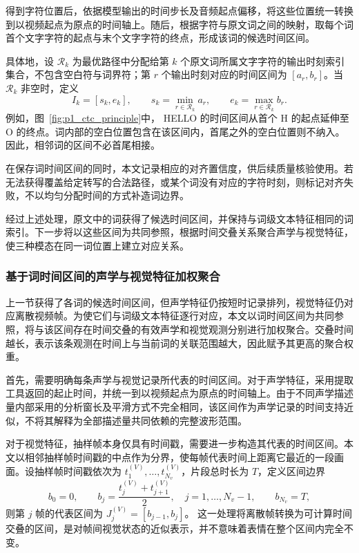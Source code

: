 得到字符位置后，依据模型输出的时间步长及音频起点偏移，将这些位置统一转换到以视频起点为原点的时间轴上。随后，根据字符与原文词之间的映射，取每个词首个文字字符的起点与末个文字字符的终点，形成该词的候选时间区间。

具体地，设 $\mathcal{R}_k$ 为最优路径中分配给第 $k$ 个原文词所属文字字符的输出时刻索引集合，不包含空白符与词界符；第 $r$ 个输出时刻对应的时间区间为 $[a_r,b_r]$。当 $\mathcal{R}_k$ 非空时，定义
\begin{equation}
I_k=[s_k,e_k],
\qquad
s_k=\min_{r\in\mathcal{R}_k}a_r,
\qquad
e_k=\max_{r\in\mathcal{R}_k}b_r.
\label{eq:p1_ctc_word_interval}
\end{equation}
例如，图~\ref{fig:p1_ctc_principle}中，
HELLO 的时间区间从首个 H 的起点延伸至
O 的终点。词内部的空白位置包含在该区间内，首尾之外的空白位置则不纳入。因此，相邻词的区间不必首尾相接。

在保存词时间区间的同时，本文记录相应的对齐置信度，供后续质量核验使用。若无法获得覆盖给定转写的合法路径，或某个词没有对应的字符时刻，则标记对齐失败，不以均匀分配时间的方式补造词边界。

经过上述处理，原文中的词获得了候选时间区间，并保持与词级文本特征相同的词索引。下一步将以这些区间为共同参照，根据时间交叠关系聚合声学与视觉特征，使三种模态在同一词位置上建立对应关系。



\subsubsection{基于词时间区间的声学与视觉特征加权聚合}

上一节获得了各词的候选时间区间，但声学特征仍按短时记录排列，视觉特征仍对应离散视频帧。为使它们与词级文本特征逐行对应，本文以词时间区间为共同参照，将与该区间存在时间交叠的有效声学和视觉观测分别进行加权聚合。交叠时间越长，表示该条观测在时间上与当前词的关联范围越大，因此赋予其更高的聚合权重。

首先，需要明确每条声学与视觉记录所代表的时间区间。对于声学特征，采用提取工具返回的起止时间，并统一到以视频起点为原点的时间轴上。由于不同声学描述量内部采用的分析窗长及平滑方式不完全相同，该区间作为声学记录的时间支持近似，不将其解释为全部描述量共同依赖的完整波形范围。

对于视觉特征，抽样帧本身仅具有时间戳，需要进一步构造其代表的时间区间。本文以相邻抽样帧时间戳的中点作为分界，使每帧代表时间上距离它最近的一段画面。设抽样帧时间戳依次为
$t_1^{(V)},\ldots,t_{N_v}^{(V)}$，片段总时长为 $T$，定义区间边界
\begin{equation}
b_0=0,\qquad
b_j=\frac{t_j^{(V)}+t_{j+1}^{(V)}}{2},
\quad j=1,\ldots,N_v-1,\qquad
b_{N_v}=T,
\label{eq:p1_visual_support_edges}
\end{equation}
则第 $j$ 帧的代表区间为
$J_j^{(V)}=[b_{j-1},b_j]$。
这一处理将离散帧转换为可计算时间交叠的区间，是对帧间视觉状态的近似表示，并不意味着表情在整个区间内完全不变。

